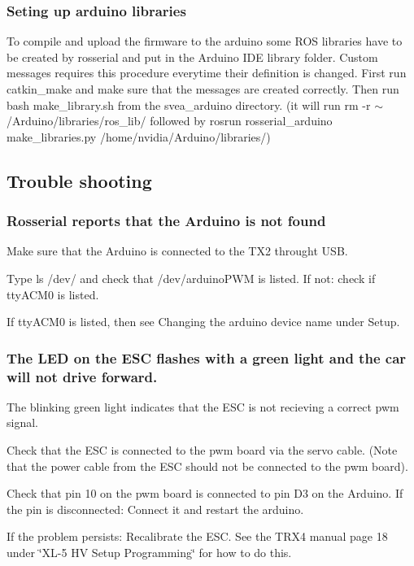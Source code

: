 \subsubsection*{Seting up arduino libraries}

To compile and upload the firmware to the arduino some R\+OS libraries have to be created by rosserial and put in the Arduino I\+DE library folder. Custom messages requires this procedure everytime their definition is changed. First run {\ttfamily catkin\+\_\+make} and make sure that the messages are created correctly. Then run {\ttfamily bash make\+\_\+library.\+sh} from the {\ttfamily svea\+\_\+arduino} directory. (it will run {\ttfamily rm -\/r $\sim$/\+Arduino/libraries/ros\+\_\+lib/} followed by {\ttfamily rosrun rosserial\+\_\+arduino make\+\_\+libraries.\+py /home/nvidia/\+Arduino/libraries/})

\subsection*{Trouble shooting}

\subsubsection*{Rosserial reports that the Arduino is not found}


\begin{DoxyEnumerate}
\item Make sure that the Arduino is connected to the T\+X2 throught U\+SB.
\item Type {\ttfamily ls /dev/} and check that {\ttfamily /dev/arduino\+P\+WM} is listed. If not\+: check if {\ttfamily tty\+A\+C\+M0} is listed.
\item If {\ttfamily tty\+A\+C\+M0} is listed, then see {\ttfamily Changing the arduino device name} under {\ttfamily Setup}.\textquotesingle{}
\end{DoxyEnumerate}

\subsubsection*{The L\+ED on the E\+SC flashes with a green light and the car will not drive forward.}

The blinking green light indicates that the E\+SC is not recieving a correct pwm signal.
\begin{DoxyEnumerate}
\item Check that the E\+SC is connected to the pwm board via the servo cable. (Note that the power cable from the E\+SC should not be connected to the pwm board).
\item Check that pin 10 on the pwm board is connected to pin D3 on the Arduino. If the pin is disconnected\+: Connect it and restart the arduino.
\item If the problem persists\+: Recalibrate the E\+SC. See the T\+R\+X4 manual page 18 under \char`\"{}\+X\+L-\/5 H\+V Setup Programming\char`\"{} for how to do this.
\end{DoxyEnumerate}

